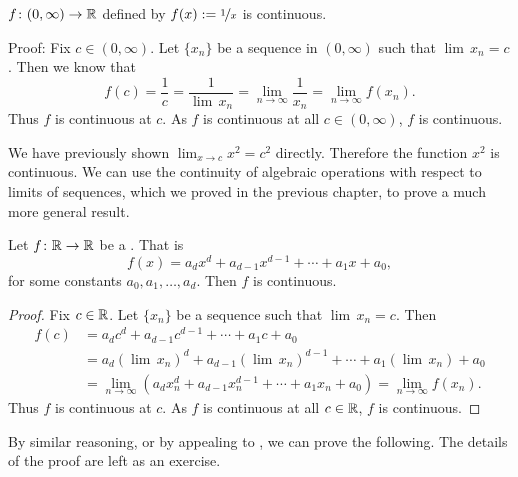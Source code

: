 \begin{example}
$f \colon (0,\infty) \to {\mathbb{R}}$ defined by
$f(x) := \nicefrac{1}{x}$ is continuous.

Proof: Fix $c \in (0,\infty)$.  
Let $\{ x_n \}$ be a sequence in $(0,\infty)$ such that
$\lim\, x_n = c$.  Then we know that
\begin{equation*}
f(c) = \frac{1}{c}
=
\frac{1}{\lim\, x_n}
=
\lim_{n \to \infty} \frac{1}{x_n}
=
\lim_{n \to \infty} f(x_n) .
\end{equation*}
Thus $f$ is continuous at $c$.  As $f$ is continuous at all $c \in
(0,\infty)$, $f$ is continuous.
\end{example}

We have previously shown $\lim_{x \to c} x^2 = c^2$ directly.  Therefore
the function $x^2$ is continuous.  We can use the continuity of
algebraic operations with respect to limits of sequences, which we proved in
the previous chapter, to prove a much more general result.

\begin{prop}
Let $f \colon {\mathbb{R}} \to {\mathbb{R}}$ be a \emph{}.  That is
\begin{equation*}
f(x) = a_d x^d + a_{d-1} x^{d-1} + \cdots + a_1 x + a_0 ,
\end{equation*}
for some constants $a_0, a_1, \ldots, a_d$.
Then $f$ is continuous.
\end{prop}

\begin{proof}
Fix $c \in {\mathbb{R}}$.  
Let $\{ x_n \}$ be a sequence such that
$\lim\, x_n = c$.  Then
\begin{equation*}
\begin{split}
f(c) &=
a_d c^d + a_{d-1} c^{d-1} + \cdots + a_1 c + a_0 
\\
&= 
a_d {(\lim\, x_n)}^d + a_{d-1} {(\lim\, x_n)}^{d-1} + \cdots + a_1 (\lim\, x_n) + a_0 
\\
& =
\lim_{n \to \infty}
\left(
a_d x_n^d + a_{d-1} x_n^{d-1} + \cdots + a_1 x_n + a_0 
\right)
=
\lim_{n \to \infty}
f(x_n) .
\end{split}
\end{equation*}
Thus $f$ is continuous at $c$.  As $f$ is continuous at all $c \in {\mathbb{R}}$,
$f$ is continuous.
\end{proof}

By similar reasoning, or by appealing to ,
we can prove the following.  The details of the proof are left as an
exercise.


